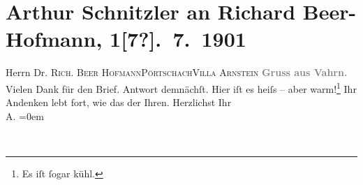 

         
         \renewcommand{\erwaehntePersonen}{Personen: Richard Beer-Hofmann}
         \renewcommand{\erwaehnteOrte}{Orte: Pörtschach, Vahrn, Villa Arnstein}
         \renewcommand{\erwaehnteWerke}{}
               \section[Arthur Schnitzler an Richard Beer-Hofmann, 1{[}7?{]}. 7. 1901]{ Arthur Schnitzler an Richard Beer-Hofmann, 1{[}7?{]}. 7. 1901}\nopagebreak{}\rehead{ }\begin{ledgroupsized}[t]{13cm}\normalsize\beginnumbering \toendnotes[C]{\smallbreak\pagebreak[2]} 
\pstart{}{\pb}Herrn Dr. \textsc{Rich. Beer
                     Hofmann}\pend{}\pstart{}\textsc{Pörtschach}\pend{}\pstart{}\textsc{Villa Arnstein}\pend{}{\bigskip}\pstart
           \noindent{}{\pb}\textcolor{gray}{\textbf{Gruss aus Vahrn.}}\pend
           \pstart
           Vielen Dank für den Brief. Antwort demnächſt.\pend
           \pstart
           Hier iſt es heiſs – aber warm!\footnote{\noindent{}Es iſt ſogar kühl.} Ihr Andenken lebt fort, wie das der Ihren.\pend
           \pstart
           Herzlichst Ihr{\\[\baselineskip]}\spacefill\mbox{A.}\pend
           \leftskip=0em{}
         
         \endnumbering{}\end{ledgroupsized}  \newcommand{\dateiname}{L01148}\newcommand{\titel}{Arthur Schnitzler an Richard Beer-Hofmann, 1[7?]. 7. 1901}\newcommand{\editorInnen}{Martin Anton Müller und Gerd-Hermann Susen}
      